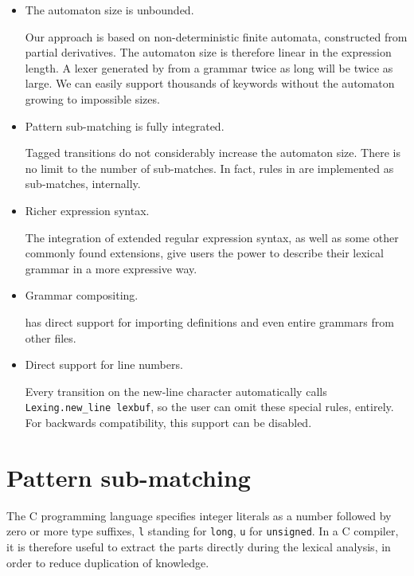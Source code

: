 \begin{itemize}

   \item The automaton size is unbounded.

      Our approach is based on non-deterministic finite automata, constructed
      from partial derivatives. The automaton size is therefore linear in the
      expression length. A lexer generated by \reml{} from a grammar twice as
      long will be twice as large. We can easily support thousands of keywords
      without the automaton growing to impossible sizes.

   \item Pattern sub-matching is fully integrated.

      Tagged transitions do not considerably increase the automaton size. There
      is no limit to the number of sub-matches. In fact, rules in \reml{} are
      implemented as sub-matches, internally.

   \item Richer expression syntax.

      The integration of extended regular expression syntax, as well as some
      other commonly found extensions, give \reml{} users the power to describe
      their lexical grammar in a more expressive way.

   \item Grammar compositing.

      \reml{} has direct support for importing definitions and even entire
      grammars from other files.

   \item Direct support for line numbers.

      Every transition on the new-line character automatically calls
      \texttt{Lexing.new\_line lexbuf}, so the user can omit these special
      rules, entirely. For backwards compatibility, this support can be
      disabled.

\end{itemize}


\section{Pattern sub-matching}

The C programming language specifies integer literals as a number followed by
zero or more type suffixes, \texttt{l} standing for \texttt{long}, \texttt{u}
for \texttt{unsigned}. In a C compiler, it is therefore useful to extract the
parts directly during the lexical analysis, in order to reduce duplication of
knowledge.

